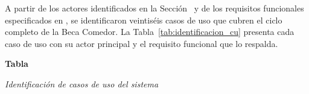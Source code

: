\label{sec:cap5_identificacion_cu}

A partir de los actores identificados en la Sección~ y de los requisitos funcionales especificados en , se identificaron veintiséis casos de uso que cubren el ciclo completo de la Beca Comedor. La Tabla~\ref{tab:identificacion_cu} presenta cada caso de uso con su actor principal y el requisito funcional que lo respalda.

\label{tab:identificacion_cu}
\noindent\textbf{Tabla~\thetable}\par\nopagebreak
\noindent\textit{Identificación de casos de uso del sistema}\par\nopagebreak
